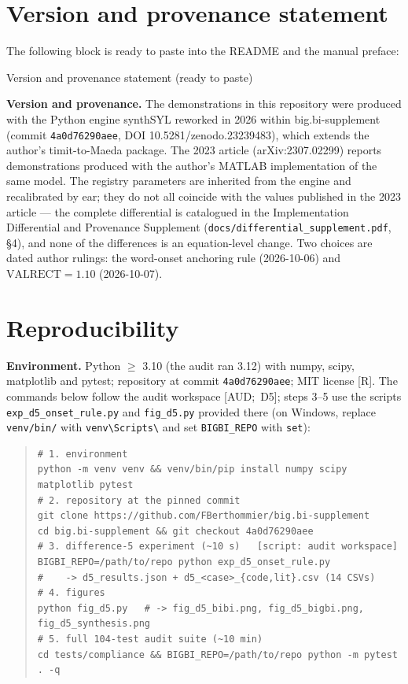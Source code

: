 \documentclass[11pt,letterpaper]{article}
\newcommand{\code}[1]{\texttt{#1}}
\begin{document}
\section{Version and provenance statement}

The following block is ready to paste into the README and the manual preface:
\begin{pastebox}{Version and provenance statement (ready to paste)}
\small\raggedright
\textbf{Version and provenance.} The demonstrations in this repository were
produced with the Python engine synthSYL reworked in 2026 within
big.bi-supplement (commit \code{4a0d76290aee},
DOI 10.5281/zenodo.23239483), which extends the author's timit-to-Maeda
package. The 2023 article (arXiv:2307.02299) reports demonstrations produced
with the author's MATLAB implementation of the same model. The registry
parameters are inherited from the engine and recalibrated by ear; they do not
all coincide with the values published in the 2023 article --- the complete
differential is catalogued in the Implementation Differential and Provenance
Supplement (\code{docs/differential\_supplement.pdf}, \S4), and none of the
differences is an equation-level change. Two choices are dated author
rulings: the word-onset anchoring rule (2026-10-06) and
$\mathrm{VALRECT} = 1.10$ (2026-10-07).
\end{pastebox}

\section{Reproducibility}

\textbf{Environment.} Python $\ge$ 3.10 (the audit ran 3.12) with
numpy, scipy, matplotlib and pytest; repository at commit
\code{4a0d76290aee}; MIT license \hbox{[R]}. The commands below follow the
audit workspace \hbox{[AUD; D5]}; steps 3--5 use the scripts
\code{exp\_d5\_onset\_rule.py} and \code{fig\_d5.py} provided there (on
Windows, replace \code{venv/bin/} with \code{venv\textbackslash Scripts\textbackslash} and set
\code{BIGBI\_REPO} with \code{set}):
\begin{quote}\small
\begin{verbatim}
# 1. environment
python -m venv venv && venv/bin/pip install numpy scipy matplotlib pytest
# 2. repository at the pinned commit
git clone https://github.com/FBerthommier/big.bi-supplement
cd big.bi-supplement && git checkout 4a0d76290aee
# 3. difference-5 experiment (~10 s)   [script: audit workspace]
BIGBI_REPO=/path/to/repo python exp_d5_onset_rule.py
#    -> d5_results.json + d5_<case>_{code,lit}.csv (14 CSVs)
# 4. figures
python fig_d5.py   # -> fig_d5_bibi.png, fig_d5_bigbi.png, fig_d5_synthesis.png
# 5. full 104-test audit suite (~10 min)
cd tests/compliance && BIGBI_REPO=/path/to/repo python -m pytest . -q
\end{verbatim}
\end{quote}
\end{document}
